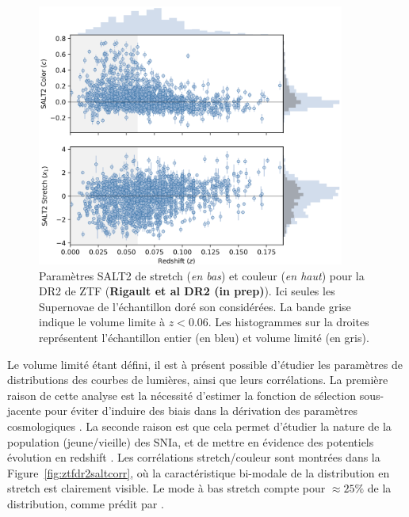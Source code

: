 \documentclass[../main/main.tex]{subfiles}
\begin{document}
\begin{figure}[h]
  \centering
  \includegraphics[width=0.9\textwidth]{../figures/02_ztf/ztfdr2stretchcolor.png}
  \caption[Paramètres SALT2 de stretch et couleur pour la DR2 de
  ZTF]{Paramètres SALT2 de stretch (\textit{en bas}) et couleur
    (\textit{en haut}) pour la DR2 de ZTF (\textbf{Rigault et al DR2 (in prep)}). Ici seules les Supernovae de
    l'échantillon doré son considérées. La bande grise indique le
    volume limite à $z<0.06$. Les histogrammes sur la droites
    représentent l'échantillon entier (en bleu) et volume limité (en gris).}
  \label{fig:ztfdr2salt}
\end{figure}

Le volume limité étant défini, il est à présent possible d'étudier les
paramètres de distributions des courbes de lumières, ainsi que leurs
corrélations. La première raison de cette analyse est la nécessité
d'estimer la fonction de sélection sous-jacente pour éviter d'induire
des biais dans la dérivation des
paramètres cosmologiques \citep{Scolnicbias2016}. La seconde raison est
que cela permet d'étudier la nature de la population (jeune/vieille) des
SNIa, et de mettre en évidence des potentiels évolution en redshift
\citep{NoraNicolas21}. Les corrélations stretch/couleur sont montrées
dans la Figure~\ref{fig:ztfdr2saltcorr}, où la caractéristique bi-modale
de la distribution en stretch est clairement visible. Le mode à bas
stretch compte pour $\approx25\%$ de la distribution, comme prédit par \citet{NoraNicolas21}.
\end{document}
